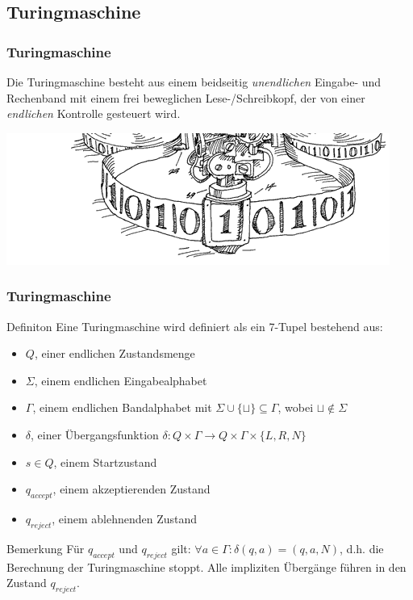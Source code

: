 \subsection{Turingmaschine}
\begin{frame}
	\frametitle{Turingmaschine}
	Die Turingmaschine besteht aus einem beidseitig \emph{unendlichen} Eingabe- und Rechenband
	mit einem frei beweglichen Lese-/Schreibkopf, der von einer \emph{endlichen} Kontrolle gesteuert wird. 
	\begin{center}
		\vspace{1cm}
		\hspace{-12mm}
		\includegraphics[scale=0.5]{images/tmaschine.png}
	\end{center}
\end{frame}
\begin{frame}
\frametitle{Turingmaschine}
\begin{block}{Definiton}
Eine Turingmaschine wird definiert als ein 7-Tupel bestehend aus:
 \begin{itemize}
 \item $Q$, einer endlichen Zustandsmenge
 \item $\Sigma$, einem endlichen Eingabealphabet
 \item $\Gamma$, einem endlichen Bandalphabet mit $\Sigma \cup\{\sqcup\} \subseteq \Gamma$, wobei $\sqcup \notin \Sigma$
 \item $\delta$, einer Übergangsfunktion $\delta: Q\times\Gamma \rightarrow Q\times\Gamma\times\{L, R, N\}$
 \item $s \in Q$, einem Startzustand
 \item $q_{accept}$, einem akzeptierenden Zustand
 \item $q_{reject}$, einem ablehnenden Zustand
 \end{itemize}
\end{block}
\begin{block}{Bemerkung}
 Für $q_{accept}$ und $q_{reject}$ gilt: $\forall a \in \Gamma: \delta(q, a) = (q, a, N)$, d.h. die Berechnung der Turingmaschine stoppt. Alle impliziten Übergänge führen in den Zustand $q_{reject}$.
\end{block}
\end{frame}


